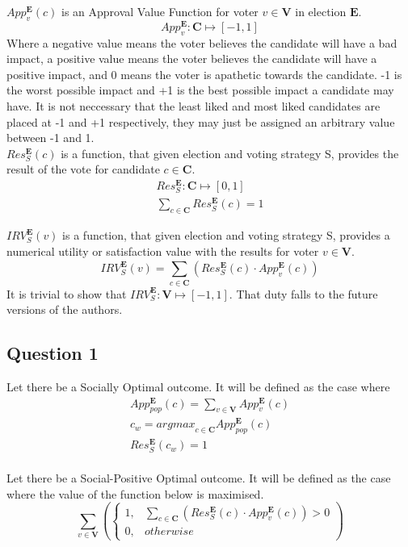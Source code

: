\documentclass{article}
\begin{document}
$App^{\pmb{E}}_{v}(c)$ is an Approval Value Function for voter $v \in \pmb{V}$ in election $\pmb{E}$.
\begin{equation}
App^{\pmb{E}}_{v} : \pmb{C} \mapsto [-1,1]
\end{equation}
Where a negative value means the voter believes the candidate will have a bad impact, a positive value means the voter believes the candidate will have a positive impact, and 0 means the voter is apathetic towards the candidate. -1 is the worst possible impact and +1 is the best possible impact a candidate may have. It is not neccessary that the least liked and most liked candidates are placed at -1 and +1 respectively, they may just be assigned an arbitrary value between -1 and 1.\\

$Res^{\pmb{E}}_{S}(c)$ is a function, that given election  and voting strategy {S}, provides the result of the vote for candidate $c \in \pmb{C}$.
\begin{gather}
Res^{\pmb{E}}_{S} : \pmb{C} \mapsto [0,1]\\
\sum^{}_{c \in \pmb{C}}{Res^{\pmb{E}}_{S}(c)} = 1
\end{gather}

${IRV}^{\pmb{E}}_{S}(v)$ is a function, that given election  and voting strategy {S}, provides a numerical utility or satisfaction value with the results for voter $v \in \pmb{V}$.
\begin{equation}
{IRV}^{\pmb{E}}_{S}(v) = \sum^{}_{c \in \pmb{C}}{(Res^{\pmb{E}}_{S}(c) \cdot App^{\pmb{E}}_{v}(c))}
\end{equation}
It is trivial to show that ${IRV}^{\pmb{E}}_{S} : \pmb{V} \mapsto [-1,1]$. That duty falls to the future versions of the authors.


\subsection{Question 1}

Let there be a Socially Optimal outcome. It will be defined as the case where
\begin{gather}
App^{\pmb{E}}_{pop}(c) = \sum^{}_{v \in \pmb{V}}{App^{\pmb{E}}_{v}(c)}\\
c_{w} = {argmax}_{c \in \pmb{C}} App^{\pmb{E}}_{pop}(c)\\
Res^{\pmb{E}}_{S}(c_{w}) = 1
\end{gather}\\

Let there be a Social-Positive Optimal outcome. It will be defined as the case where the value of the function below is maximised.
\begin{equation}
\sum^{}_{v \in \pmb{V}}{\left(
\begin{cases}
1, & \sum^{}_{c \in \pmb{C}}{(Res^{\pmb{E}}_{S}(c) \cdot App^{\pmb{E}}_{v}(c))} > 0\\
0, & {otherwise}
\end{cases}
\right)}
\end{equation}\\
\end{document}

